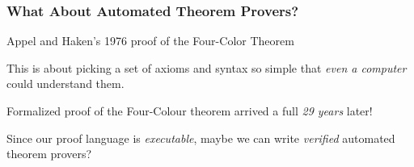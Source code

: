 \documentclass[usenames,dvipsnames]{beamer}
\begin{document}
\begin{frame}
  \frametitle{What About Automated Theorem Provers?}
  \pause
  Appel and Haken's 1976 proof of the Four-Color Theorem


  \pause
  This is about picking a set of axioms and syntax so simple that \emph{even a
    computer} could understand them.


  \pause
  Formalized proof of the Four-Colour theorem arrived a full \emph{29 years}
  later!


  \pause

  Since our proof language is \emph{executable}, maybe we can write
  \emph{verified} automated theorem provers?
\end{frame}
\end{document}
